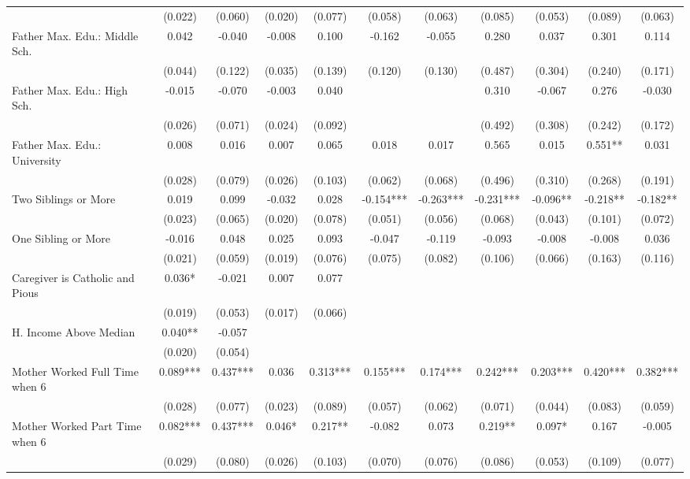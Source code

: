 \begin{tabular}{lcccccccccc}
 & (0.022) & (0.060) & (0.020) & (0.077) & (0.058) & (0.063) & (0.085) & (0.053) & (0.089) & (0.063) \\
Father Max. Edu.: Middle Sch. & 0.042 & -0.040 & -0.008 & 0.100 & -0.162 & -0.055 & 0.280 & 0.037 & 0.301 & 0.114 \\
 & (0.044) & (0.122) & (0.035) & (0.139) & (0.120) & (0.130) & (0.487) & (0.304) & (0.240) & (0.171) \\
Father Max. Edu.: High Sch. & -0.015 & -0.070 & -0.003 & 0.040 &  &  & 0.310 & -0.067 & 0.276 & -0.030 \\
 & (0.026) & (0.071) & (0.024) & (0.092) &  &  & (0.492) & (0.308) & (0.242) & (0.172) \\
Father Max. Edu.: University & 0.008 & 0.016 & 0.007 & 0.065 & 0.018 & 0.017 & 0.565 & 0.015 & 0.551** & 0.031 \\
 & (0.028) & (0.079) & (0.026) & (0.103) & (0.062) & (0.068) & (0.496) & (0.310) & (0.268) & (0.191) \\
Two Siblings or More & 0.019 & 0.099 & -0.032 & 0.028 & -0.154*** & -0.263*** & -0.231*** & -0.096** & -0.218** & -0.182** \\
 & (0.023) & (0.065) & (0.020) & (0.078) & (0.051) & (0.056) & (0.068) & (0.043) & (0.101) & (0.072) \\
One Sibling or More & -0.016 & 0.048 & 0.025 & 0.093 & -0.047 & -0.119 & -0.093 & -0.008 & -0.008 & 0.036 \\
 & (0.021) & (0.059) & (0.019) & (0.076) & (0.075) & (0.082) & (0.106) & (0.066) & (0.163) & (0.116) \\
Caregiver is Catholic and Pious & 0.036* & -0.021 & 0.007 & 0.077 &  &  &  &  &  &  \\
 & (0.019) & (0.053) & (0.017) & (0.066) &  &  &  &  &  &  \\
H. Income Above Median & 0.040** & -0.057 &  &  &  &  &  &  &  &  \\
 & (0.020) & (0.054) &  &  &  &  &  &  &  &  \\
Mother Worked Full Time when 6 & 0.089*** & 0.437*** & 0.036 & 0.313*** & 0.155*** & 0.174*** & 0.242*** & 0.203*** & 0.420*** & 0.382*** \\
 & (0.028) & (0.077) & (0.023) & (0.089) & (0.057) & (0.062) & (0.071) & (0.044) & (0.083) & (0.059) \\
Mother Worked Part Time when 6 & 0.082*** & 0.437*** & 0.046* & 0.217** & -0.082 & 0.073 & 0.219** & 0.097* & 0.167 & -0.005 \\
 & (0.029) & (0.080) & (0.026) & (0.103) & (0.070) & (0.076) & (0.086) & (0.053) & (0.109) & (0.077) \\

\end{tabular}
